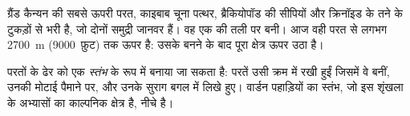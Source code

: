 \begin{example}[ग्रैंड कैन्यन का शिखर]\label{ex:g7:sediments-and-fossils:kaibab}
ग्रैंड कैन्यन की सबसे ऊपरी परत, काइबाब चूना पत्थर, ब्रैकियोपॉड की सीपियों और
क्रिनॉइड के तने के टुकड़ों से भरी है, जो दोनों समुद्री जानवर हैं। वह एक  की तली
पर बनी। आज वही परत  से लगभग \qty{2700}{m} (\num{9000}~फ़ुट) तक ऊपर है:
उसके बनने के बाद पूरा क्षेत्र ऊपर
उठा है।
\end{example}

परतों के ढेर को एक \emph{स्तंभ} के रूप में बनाया जा सकता है: परतें उसी क्रम में
रखी हुईं जिसमें वे बनीं, उनकी मोटाई पैमाने पर, और उनके सुराग बगल में लिखे हुए।
वार्डन पहाड़ियों का स्तंभ, जो इस शृंखला के अभ्यासों का काल्पनिक क्षेत्र है,
नीचे है।

